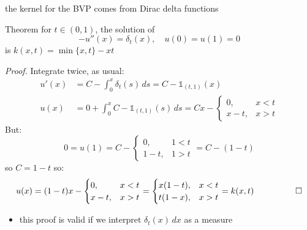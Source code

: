 \documentclass[10pt,
               svgnames,
               hyperref={colorlinks,
                         citecolor=DeepPink4,
                         linkcolor=FireBrick,
                         urlcolor=Maroon},
               usepdftitle=false]{beamer}
\newcommand{\one}{\mathds{1}}
\begin{document}
\begin{frame}{the kernel for the BVP comes from Dirac delta functions}

\begin{block}{Theorem}
for $t\in (0,1)$, the solution of
    $$-u''(x) = \delta_t(x), \quad u(0) = u(1) = 0$$
is $k(x,t) = \min\{x,t\} - xt$
\end{block}

{\footnotesize
\noindent \emph{Proof.}  Integrate twice, as usual:
\begin{align*}
u'(x) &= C - \int_0^x \delta_t(s)\,ds = C - \one_{(t,1)}(x) \\
u(x) &= 0 + \int_0^x C - \one_{(t,1)}(s) \,ds = C x - \begin{cases} 0, & x<t \\ x-t, & x>t \end{cases}
\end{align*}
But:
    $$0 = u(1) = C - \begin{cases} 0, & 1<t \\ 1-t, & 1>t \end{cases} = C - (1-t)$$
so $C=1-t$ so:
\begin{equation*}
u(x) = (1-t) x - \begin{cases} 0, & x<t \\ x-t, & x>t \end{cases} = \begin{cases} x (1 - t), & x < t \\ t (1 - x), & x > t \end{cases} = k(x,t) \hspace{10mm} \qed
\end{equation*}

\begin{itemize}
\item this proof is valid if we interpret $\delta_t(x)\,dx$ as a measure
\end{itemize}
}
\end{frame}
\end{document}
